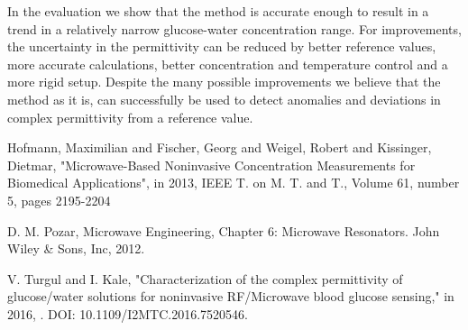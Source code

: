 \documentclass[10pt,final,conference,a4paper,twocolumn]{IEEEtran_AntennEMB_GigaHertz2016}
\begin{document}
In the evaluation we show that the method is accurate enough to result in a trend in a relatively narrow glucose-water concentration range. For improvements, the uncertainty in the permittivity can be reduced by better reference values, more accurate calculations, better concentration and temperature control and a more rigid setup. Despite the many possible improvements we believe that the method as it is, can successfully be used to detect anomalies and deviations in complex permittivity from a reference value.







%
%


\begin{thebibliography}{99}
	
	
	
	 Hofmann, Maximilian and Fischer, Georg and Weigel, Robert and Kissinger, Dietmar, "Microwave-Based Noninvasive Concentration Measurements for Biomedical Applications", in 2013, IEEE T. on M. T. and T., Volume 61, number 5, pages 2195-2204
	
	 D. M. Pozar, Microwave Engineering, Chapter 6: Microwave Resonators. John Wiley \& Sons,
	Inc, 2012.
	
	 V. Turgul and I. Kale, "Characterization of the complex permittivity of glucose/water solutions for noninvasive RF/Microwave blood glucose sensing," in 2016, . DOI: 10.1109/I2MTC.2016.7520546.
\end{thebibliography}
\end{document}
